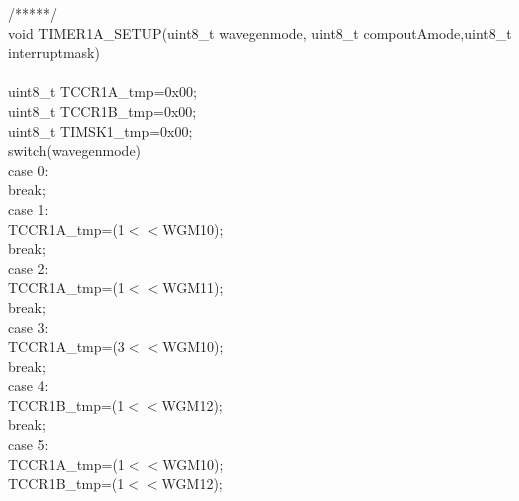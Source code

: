\documentclass[titlepage, a4paper, 10pt, reqno, openany]{report}
\begin{document}
\begin{minipage}[t]{.35\linewidth}
/*****/ \\
void TIMER1A\_SETUP(uint8\_t wavegenmode, uint8\_t compoutAmode,uint8\_t interruptmask) \\
\textbraceleft \\
\hspace*{.5cm}	uint8\_t TCCR1A\_tmp=0x00; \\
\hspace*{.5cm}	uint8\_t TCCR1B\_tmp=0x00; \\
\hspace*{.5cm}	uint8\_t TIMSK1\_tmp=0x00; \\
\hspace*{.5cm}	switch(wavegenmode)\textbraceleft \\
\hspace*{1cm}		case 0: \\
\hspace*{1.5cm}			break; \\
\hspace*{1cm}		case 1: \\
\hspace*{1.5cm}			TCCR1A\_tmp=(1$<<$WGM10); \\
\hspace*{1.5cm}			break; \\
\hspace*{1cm}		case 2: \\
\hspace*{1.5cm}			TCCR1A\_tmp=(1$<<$WGM11); \\
\hspace*{1.5cm}			break; \\
\hspace*{1cm}		case 3: \\
\hspace*{1.5cm}			TCCR1A\_tmp=(3$<<$WGM10); \\
\hspace*{1.5cm}			break; \\
\hspace*{1cm}		case 4: \\
\hspace*{1.5cm}			TCCR1B\_tmp=(1$<<$WGM12); \\
\hspace*{1.5cm}			break; \\
\hspace*{1cm}		case 5: \\
\hspace*{1.5cm}			TCCR1A\_tmp=(1$<<$WGM10); \\
\hspace*{1.5cm}			TCCR1B\_tmp=(1$<<$WGM12); \\

\end{minipage}
\end{document}
